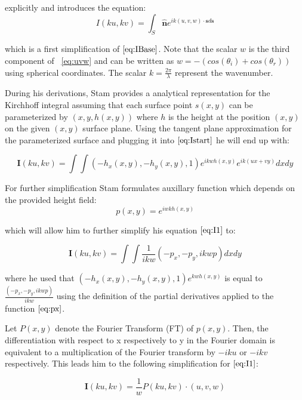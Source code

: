 explicitly and introduces the equation: 
\begin{equation}
  I(ku,kv) = \int_{S} \hat{\mathbf{n}} e^{ik(u,v,w) \cdot \mathbf{s} d\mathbf{s}} 
\label{eq:Istart}
\end{equation}

which is a first simplification of $\ref{eq:IBase}$. Note that the scalar $w$ is the third component of ~\ref{eq:uvw} and can be written as $w = -(cos(\theta_i)+cos(\theta_r))$ using spherical coordinates. The scalar $k=\frac{2\pi}{\lambda}$ represent the wavenumber.


During his derivations, Stam provides a analytical representation for the Kirchhoff integral assuming that each surface point $s(x,y)$ can be parameterized by $(x,y,h(x,y))$ where $h$ is the height at the position $(x,y)$ on the given $(x,y)$ surface plane. Using the tangent plane approximation for the parameterized surface and plugging it into $\ref{eq:Istart}$ he will end up with: 

\begin{equation}
    \mathbf{I}(ku, kv) = \int \int (-h_{x}(x,y), -h_{y}(x,y), 1) e^{ikwh(x,y)} e^{ik(ux + vy)} dx dy
\label{eq:I1}
\end{equation}

For further simplification Stam formulates auxillary function which depends on the provided height field: 
\begin{equation}
  p(x,y) = e^{iwkh(x,y)} 
\label{eq:px}
\end{equation}

which will allow him to further simplify his equation $\ref{eq:I1}$ to:

\begin{equation}
    \mathbf{I}(ku, kv) = \int \int \frac{1}{ikw}(-p_x, -p_y, ikwp) dx dy
\label{eq:I2}
\end{equation}

where he used that $(-h_{x}(x,y), -h_{y}(x,y), 1)e^{kwh(x,y)}$ is equal to $\frac{(-p_x, -p_y, ikwp)}{ikw}$ using the definition of the partial derivatives applied to the function $\ref{eq:px}$.

Let $P(x,y)$ denote the Fourier Transform (FT) of $p(x,y)$. Then, the differentiation with respect to x respectively to y in the Fourier domain is equivalent to a multiplication of the Fourier transform by $-iku$ or $-ikv$ respectively. This leads him to the following simplification for $\ref{eq:I1}$:

\begin{equation}
    \mathbf{I}(ku, kv) = \frac{1}{w}P(ku, kv) \cdot (u,v,w)
\label{eq:I3}
\end{equation}

